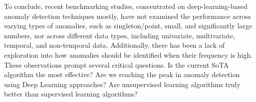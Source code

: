 To conclude, %
recent benchmarking studies, concentrated on deep-learning-based anomaly detection techniques mostly, have not examined the performance across varying types of anomalies, such as singleton/point, small, and significantly large numbers, nor across different data types, including univariate, multivariate, temporal, and non-temporal data. Additionally, there has been a lack of exploration into how anomalies should be identified when their frequency is high. These observations prompt several critical questions. Is the current SoTA algorithm the most effective? Are we reaching the peak in anomaly detection using Deep Learning approaches? Are unsupervised learning algorithms truly better than supervised learning algorithms?


\newpage